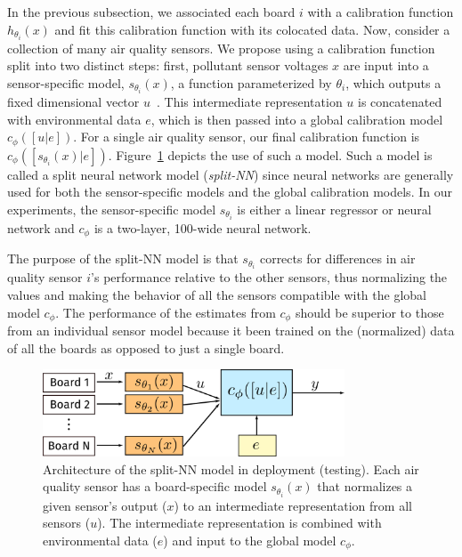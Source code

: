 \documentclass[journal abbreviation, manuscript]{copernicus}
\begin{document}
In the previous subsection, we associated each board $i$ with a calibration function $h_{\theta_i}(x)$ and fit this calibration function with its colocated data. Now, consider a collection of many air quality sensors. We propose using a calibration function split into two distinct steps: first, pollutant sensor voltages $x$ are input into a sensor-specific model, $s_{\theta_i}(x)$, a function parameterized by $\theta_i$, which outputs a fixed dimensional vector $u$~\citep{Goodfellow-et-al-2016}. This intermediate representation $u$ is concatenated with environmental data $e$, which is then passed into a global calibration model $c_\phi([u | e])$. For a single air quality sensor, our final calibration function is $c_\phi([s_{\theta_i}(x) | e])$.  Figure~\ref{fig:split-nn-deploy} depicts the use of such a model.  Such a model is called a split neural network model (\textit{split-NN}) since neural networks are generally used for both the sensor-specific models and the global calibration models. In our experiments, the sensor-specific model $s_{\theta_i}$ is either a linear regressor or neural network  and $c_\phi$ is a two-layer, 100-wide neural network. 

The purpose of the split-NN model is that $s_{\theta_i}$ corrects for differences in air quality sensor $i$'s performance relative to the other sensors, thus normalizing the values and making the behavior of all the sensors compatible with the global model $c_\phi$.  The performance of the estimates from $c_\phi$ should be superior to those from an individual sensor model because it been trained on the (normalized) data of all the boards as opposed to just a single board.

\begin{figure}
    \includegraphics[width=0.8\textwidth]{writeup/img/split-model.png}
    \caption{Architecture of the split-NN model in deployment (testing).  Each air quality sensor has a board-specific model $s_{\theta_i}(x)$ that normalizes a given sensor's output ($x$) to an intermediate representation from all sensors ($u$). The intermediate representation is combined with environmental data ($e$) and input to the global model $c_\phi$.}
    \label{fig:split-nn-deploy}
\end{figure}
\end{document}
